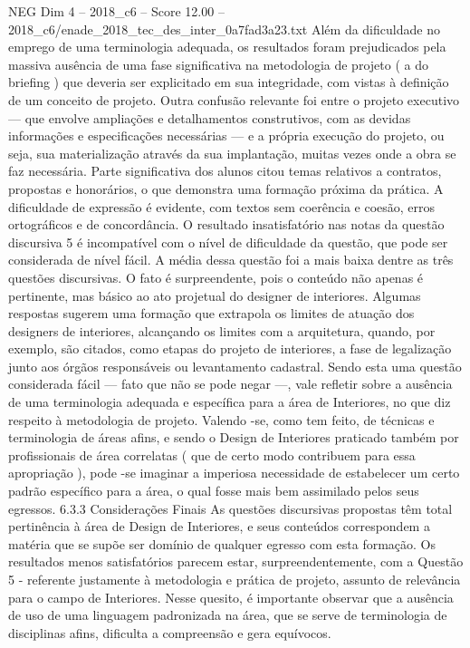 \begin{textsample}{NEG Dim 4 – 2018\_c6 – Score 12.00 – 2018\_c6/enade\_2018\_tec\_des\_inter\_0a7fad3a23.txt}
Além da dificuldade no emprego de uma terminologia adequada, os resultados foram prejudicados pela massiva ausência de uma fase significativa na metodologia de projeto ( a do briefing ) que deveria ser explicitado em sua integridade, com vistas à definição de um conceito de projeto.
Outra confusão relevante foi entre o projeto executivo — que envolve ampliações e detalhamentos construtivos, com as devidas informações e especificações necessárias — e a própria execução do projeto, ou seja, sua materialização através da sua implantação, muitas vezes onde a obra se faz necessária.
Parte significativa dos alunos citou temas relativos a contratos, propostas e honorários, o que demonstra uma formação próxima da prática.
A dificuldade de expressão é evidente, com textos sem coerência e coesão, erros ortográficos e de concordância.
O resultado insatisfatório nas notas da questão discursiva 5 é incompatível com o nível de dificuldade da questão, que pode ser considerada de nível fácil.
A média dessa questão foi a mais baixa dentre as três questões discursivas.
O fato é surpreendente, pois o conteúdo não apenas é pertinente, mas básico ao ato projetual do designer de interiores.
Algumas respostas sugerem uma formação que extrapola os limites de atuação dos designers de interiores, alcançando os limites com a arquitetura, quando, por exemplo, são citados, como etapas do projeto de interiores, a fase de legalização junto aos órgãos responsáveis ou levantamento cadastral.
Sendo esta uma questão considerada fácil — fato que não se pode negar —, vale refletir sobre a ausência de uma terminologia adequada e específica para a área de Interiores, no que diz respeito à metodologia de projeto.
Valendo -se, como tem feito, de técnicas e terminologia de áreas afins, e sendo o Design de Interiores praticado também por profissionais de área correlatas ( que de certo modo contribuem para essa apropriação ), pode -se imaginar a imperiosa necessidade de estabelecer um certo padrão específico para a área, o qual fosse mais bem assimilado pelos seus egressos. 6.3.3 Considerações Finais As questões discursivas propostas têm total pertinência à área de Design de Interiores, e seus conteúdos correspondem a matéria que se supõe ser domínio de qualquer egresso com esta formação.
Os resultados menos satisfatórios parecem estar, surpreendentemente, com a Questão 5 - referente justamente à metodologia e prática de projeto, assunto de relevância para o campo de Interiores.
Nesse quesito, é importante observar que a ausência de uso de uma linguagem padronizada na área, que se serve de terminologia de disciplinas afins, dificulta a compreensão e gera equívocos.

\end{textsample}
